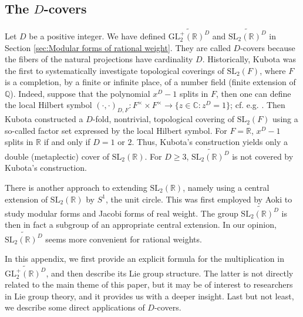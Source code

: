 \documentclass[12pt]{amsart}
\numberwithin{equation}{section}
\theoremstyle{plain}
\theoremstyle{definition}
\theoremstyle{remark}
\newcommand\numQ{\mathbb{Q}}
\newcommand\numR{\mathbb{R}}
\newcommand\numC{\mathbb{C}}
\newcommand\slR{\mathrm{SL}_2(\mathbb{R})}
\newcommand\glpR{\mathrm{GL}_2^{+}(\mathbb{R})}
\newcommand\Dcover[2]{\widetilde{#1^{#2}}}
\begin{document}
\begin{appendix}
\section{The $D$-covers}
\label{apx:covers}
Let $D$ be a positive integer. We have defined $\Dcover{\glpR}{D}$ and $\Dcover{\slR}{D}$ in Section \ref{sec:Modular forms of rational weight}. They are called $D$-covers because the fibers of the natural projections have cardinality $D$. Historically, Kubota \cite{Kub66,Kub67} was the first to systematically investigate topological coverings of $\mathrm{SL}_2(F)$, where $F$ is a completion, by a finite or infinite place, of a number field (finite extension of $\numQ$). Indeed, suppose that the polynomial $x^D-1$ splits in $F$, then one can define the local Hilbert symbol $(\cdot,\cdot)_{D,F}\colon F^\times\times F^\times\rightarrow\{z\in\numC\colon z^D=1\}$; cf. e.g. \cite[p. 260--262]{Wei74}. Then Kubota \cite[Theorem]{Kub67} constructed a $D$-fold, nontrivial, topological covering of $\mathrm{SL}_2(F)$ using a so-called factor set expressed by the local Hilbert symbol. For $F=\numR$, $x^D-1$ splits in $\numR$ if and only if $D=1$ or $2$. Thus, Kubota's construction yields only a double (metaplectic) cover of  $\slR$. For $D\geq3$, $\Dcover{\slR}{D}$ is not covered by Kubota's construction.

There is another approach to extending $\slR$, namely using a central extension of $\slR$ by $S^1$, the unit circle. This was first employed by Aoki \cite{Aok17} to study modular forms and Jacobi forms of real weight. The group $\Dcover{\slR}{D}$ is then in fact a subgroup of an appropriate central extension. In our opinion, $\Dcover{\slR}{D}$ seems more convenient for rational weights.

In this appendix, we first provide an explicit formula for the multiplication in $\Dcover{\glpR}{D}$, and then describe its Lie group structure. The latter is not directly related to the main theme of this paper, but it may be of interest to researchers in Lie group theory, and it provides us with a deeper insight. Last but not least, we describe some direct applications of $D$-covers.


\end{appendix}
\end{document}
